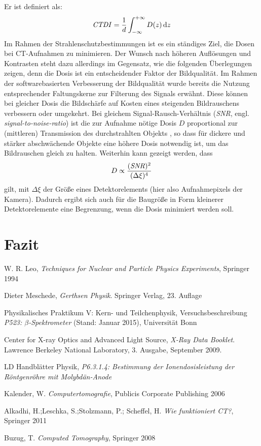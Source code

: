 \documentclass[11pt, a4paper]{article}
\numberwithin{equation}{section}
\begin{document}
Er ist definiert als:
\begin{align}
	\text{\emph{CTDI}}=\frac{1}{d}\int_{-\infty}^{+\infty}D(z)\,\mathrm{d}z
\end{align}
Im Rahmen der Strahlenschutzbestimmungen ist es ein ständiges Ziel, die Dosen bei CT-Aufnahmen zu minimieren.
Der Wunsch nach höheren Auflösungen und Kontrasten steht dazu allerdings im Gegensatz, wie die folgenden Überlegungen zeigen, denn die Dosis ist ein entscheidender Faktor der Bildqualität.
Im Rahmen der softwarebasierten Verbesserung der Bildqualität wurde bereits die Nutzung entsprechender Faltungskerne zur Filterung des Signals erwähnt.
Diese können bei gleicher Dosis die Bildschärfe auf Kosten eines steigenden Bildrauschens verbessern oder umgekehrt.
Bei gleichem Signal-Rausch-Verhältnis (\emph{SNR}, engl. \emph{signal-to-noise-ratio}) ist die zur Aufnahme nötige Dosis $D$ proportional zur (mittleren) Transmission des durchstrahlten Objekts \cite{buzug}, so dass für dickere und stärker abschwächende Objekte eine höhere Dosis notwendig ist, um das Bildrauschen gleich zu halten. 
Weiterhin kann gezeigt werden, dass
\begin{align}
	D \propto \frac{(\text{\emph{SNR}})^2}{(\Delta\xi)^4}
\end{align}
gilt, mit $\Delta\xi$ der Größe eines Detektorelements (hier also Aufnahmepixels der Kamera).
Dadurch ergibt sich auch für die Baugröße in Form kleinerer Detektorelemente eine Begrenzung, wenn die Dosis minimiert werden soll.
\section{Fazit}

\FloatBarrier
\vspace{\fill}
\begin{thebibliography}{19}
	W. R. Leo,
	\emph{Techniques for Nuclear and Particle Physics Experiments},
	Springer 1994
	
	Dieter Meschede,
	\emph{Gerthsen Physik}.
	Springer Verlag,
	23. Auflage

	Physikalisches Praktikum V: Kern- und Teilchenphysik,
	Versuchsbeschreibung \emph{P523: $\beta$-Spektrometer} (Stand: Januar 2015),
	Universität Bonn	

	Center for X-ray Optics and Advanced Light Source,
	\emph{X-Ray Data Booklet}.
	Lawrence Berkeley National Laboratory,
	3. Ausgabe,
	September 2009.

	LD Handblätter Physik,
	\emph{P6.3.1.4: Bestimmung der Ionendosisleistung der Röntgenröhre mit Molybdän-Anode}
	
	Kalender, W.
	\emph{Computertomografie},
	Publicis Corporate Publishing 2006
	
	Alkadhi, H.;Leschka, S.;Stolzmann, P.; Scheffel, H.
	\emph{Wie funktioniert CT?},
	Springer 2011
	
	Buzug, T.
	\emph{Computed Tomography},
	Springer 2008

\end{thebibliography}
\end{document}
